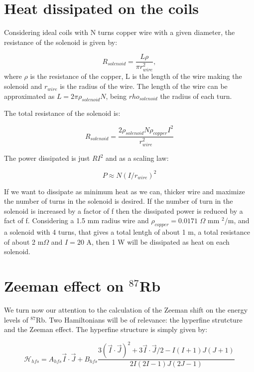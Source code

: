 \documentclass[
10pt, %
a4paper, %
oneside, %
headinclude,footinclude, %
BCOR5mm, %
]{scrartcl}
\begin{document}
\clearpage
\newpage

\section{Heat dissipated on the coils}

Considering ideal coils with N turns copper wire with a given diameter, the resistance of the solenoid is given by:

\begin{equation}
    R_{solenoid} = \frac{L\rho}{\pi r_{wire}^{2}},
\end{equation}
where $\rho$ is the resistance of the copper, L is the length of the wire making the solenoid and $r_{wire}$ is the radius of the wire. The length of the wire can be approximated as $L = 2\pi \rho_{solenoid} N$, being $rho_{solenoid}$ the radius of each turn.

The total resistance of the solenoid is:

\begin{equation}
    R_{solenoid} = \frac{2 \rho_{solenoid} N \rho_{copper} I^{2}}{r_{wire}^{2}}
\end{equation}

The power dissipated is just $RI^{2}$ and as a scaling law:

\begin{equation}
    P \approx N (I / r_{wire})^{2}
\end{equation}

If we want to dissipate as minimum heat as we can, thicker wire and maximize the number of turns in the solenoid is desired. If the number of turn in the solenoid is increased by a factor of f then the dissipated power is reduced by a fact of f. Considering a 1.5 mm radius wire and $\rho_{copper} = 0.0171$ $\Omega$ mm $^{2}$/m, and a solenoid with 4 turns, that gives a total lentgh of about 1 m, a total resistance of about 2 m$\Omega$ and $I = 20$ A, then 1 W will be dissipated as heat on each solenoid.


\clearpage
\newpage
\section{Zeeman effect on $^{87}$Rb}
We turn now our attention to the calculation of the Zeeman shift on the energy levels of $^{87}$Rb. Two Hamiltonians will be of relevance: the hyperfine strutcture and the Zeeman effect. The hyperfine structure is simply given by:

\begin{equation}
    \mathcal{H}_{hfs} = A_{hfs} \vec{I} \cdot \vec{J} + B_{hfs} \frac{ 3 (\vec{I} \cdot \vec{J})^{2} + 3 \vec{I} \cdot \vec{J}/2 - I(I+1)J(J+1)}{2I(2I-1)J(2J-1)}
\end{equation}
\end{document}

